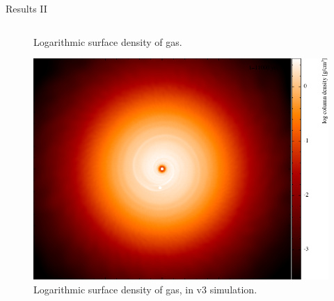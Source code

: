 \documentclass[9pt]{beamer}
\begin{document}
\begin{frame}{Results II}
\begin{columns}
\begin{column}{0.5\textwidth}
\begin{figure}
                \caption{
                    Logarithmic surface density of gas.
                }
            \end{figure}
            \begin{figure}
                \includegraphics[width=0.6\hsize]{gas-165v3}
                \caption{
                    Logarithmic surface density of gas,
                    in v3 simulation.
                }
            \end{figure}
        \end{column}
    \end{columns}
\end{frame}
\end{document}
